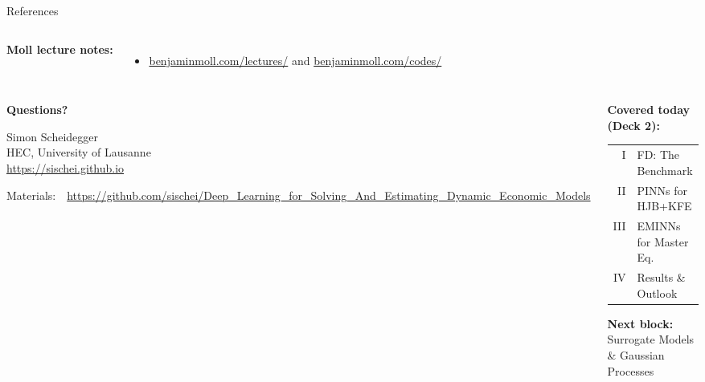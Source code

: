\documentclass[aspectratio=169,11pt]{beamer}
\begin{document}
\begin{frame}{References}
\begin{columns}[T]
\vspace{0.1em}
\textbf{Moll lecture notes:}
\begin{itemize}\itemsep0pt
    \item \url{benjaminmoll.com/lectures/} and \url{benjaminmoll.com/codes/}
\end{itemize}
\end{columns}
\end{frame}

\begin{frame}{}
\begin{columns}[c]
\begin{center}
{\Huge \textcolor{uzhblue}{\textbf{Questions?}}}

\vspace{1.0cm}
{\large Simon Scheidegger}\\[4pt]
{\small HEC, University of Lausanne}\\[4pt]
\url{https://sischei.github.io}

\vspace{0.6cm}
{\small Materials:~~\url{https://github.com/sischei/Deep_Learning_for_Solving_And_Estimating_Dynamic_Economic_Models}}
\end{center}

\begin{center}
\textbf{Covered today (Deck 2):}\\[8pt]
{\small
\begin{tabular}{rl}
I & FD: The Benchmark \\
II & PINNs for HJB+KFE \\
III & EMINNs for Master Eq. \\
IV & Results \& Outlook \\
\end{tabular}
}

\vspace{0.8cm}
\textbf{Next block:}\\[6pt]
{\large Surrogate Models}\\
{\large \& Gaussian Processes}\\[8pt]
\end{center}
\end{columns}
\end{frame}
\end{document}
